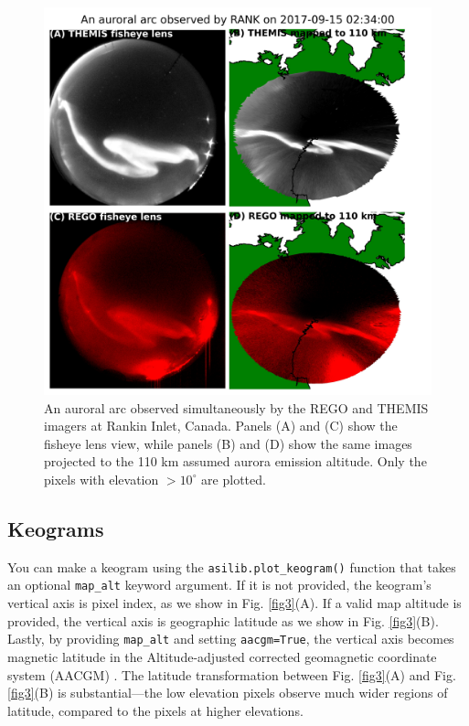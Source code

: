 \documentclass[utf8]{FrontiersinHarvard} %
\begin{document}
\begin{figure}
      \includegraphics[width=\textwidth]{figures/fig2.jpg}
      \caption{An auroral arc observed simultaneously by the REGO and THEMIS imagers at Rankin Inlet, Canada. Panels (A) and (C) show the fisheye lens view, while panels (B) and (D) show the same images projected to the 110 km assumed aurora emission altitude. Only the pixels with elevation $>10^\circ$ are plotted.}
      \label{fig2}
\end{figure}

\subsection{Keograms}
You can make a keogram using the \verb|asilib.plot_keogram()| function that takes an optional \verb|map_alt| keyword argument. If it is not provided, the keogram's vertical axis is pixel index, as we show in Fig. \ref{fig3}(A). If a valid map altitude is provided, the vertical axis is geographic latitude as we show in Fig. \ref{fig3}(B). Lastly, by providing \verb|map_alt| and setting \verb|aacgm=True|, the vertical axis becomes magnetic latitude in the Altitude-adjusted corrected geomagnetic coordinate system (AACGM) \citep{Shepherd2014}. The latitude transformation between Fig. \ref{fig3}(A) and Fig. \ref{fig3}(B) is substantial---the low elevation pixels observe much wider regions of latitude, compared to the pixels at higher elevations.
\end{document}
